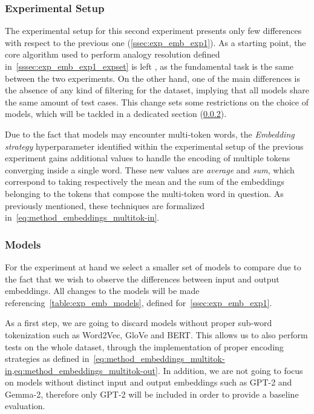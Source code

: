 \subsubsection{Experimental Setup}

The experimental setup for this second experiment presents only few differences with respect to the previous one (\cref{ssec:exp_emb_exp1}).
As a starting point, the core algorithm used to perform analogy resolution defined in~\cref{sssec:exp_emb_exp1_expset} is left , as the fundamental task is the same between the two experiments.
On the other hand, one of the main differences is the absence of any kind of filtering for the dataset, implying that all models share the same amount of test cases.
This change  sets some restrictions on the choice of models, which will be tackled in a dedicated section (\cref{sssec:exp_emb_exp2_models}).

Due to the fact that models may encounter multi-token words, the \emph{Embedding strategy} hyperparameter identified within the experimental setup of the previous experiment gains additional values to handle the encoding of multiple tokens converging inside a single word.
These new values are \emph{average} and \emph{sum}, which correspond to taking respectively the mean and the sum of the embeddings belonging to the tokens that compose the multi-token word in question.
As previously mentioned, these techniques are formalized in~\cref{eq:method_embeddings_multitok-in}.

\subsubsection{Models}\label{sssec:exp_emb_exp2_models}

For the experiment at hand we select a smaller set of models to compare due to the fact that we wish to observe the differences between input and output embeddings.
All changes to the models will be made referencing~\cref{table:exp_emb_models}, defined for~\cref{ssec:exp_emb_exp1}.

As a first step, we are going to discard models without proper sub-word tokenization such as Word2Vec, GloVe and BERT\@.
This allows us to also perform tests on the whole dataset, through the implementation of proper encoding strategies as defined in~\cref{eq:method_embeddings_multitok-in,eq:method_embeddings_multitok-out}.
In addition, we are not going to focus on models without distinct input and output embeddings such as GPT-2 and Gemma-2, therefore only GPT-2 will be included in order to provide a baseline evaluation.

